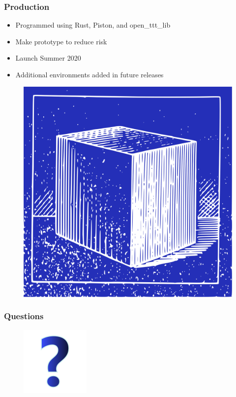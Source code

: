 \documentclass{beamer}
\begin{document}
\begin{frame}
  \frametitle{Production}

  \begin{itemize}
    \item Programmed using Rust, Piston, and open\_ttt\_lib
    \item Make prototype to reduce risk
    \item Launch Summer 2020
    \item Additional environments added in future releases
  \end{itemize}

  \begin{figure}
    \vspace{1em}
    \includegraphics[height=0.40\textheight]{img/clip-art/blueprint-cube}
  \end{figure}

\end{frame}


\begin{frame}
  \frametitle{Questions}

  \begin{figure}
    \includegraphics[height=0.50\textheight]{img/clip-art/question-mark}
  \end{figure}

\end{frame}
\end{document}
